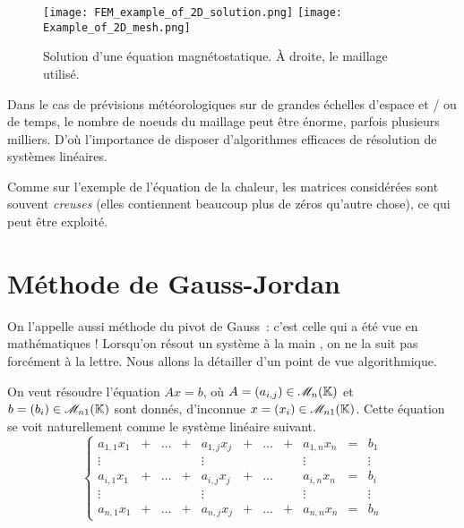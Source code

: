 \begin{figure}
\begin{center}
  \texttt{[image: FEM\_example\_of\_2D\_solution.png]}
  \texttt{[image: Example\_of\_2D\_mesh.png]}
  \caption{Solution d'une équation magnétostatique. À droite, le maillage utilisé.}
  \label{fig:eqelectromag}
\end{center}
\end{figure}



Dans le cas de prévisions météorologiques sur de grandes échelles d'espace et / ou de temps, le nombre de noeuds du 
maillage peut être énorme, parfois plusieurs milliers. D'où l'importance de disposer d'algorithmes efficaces de 
résolution de systèmes linéaires.

Comme sur l'exemple de l'équation de la chaleur, les matrices considérées sont souvent \emph{creuses} (elles 
contiennent beaucoup plus de zéros qu'autre chose), ce qui peut être exploité.


\section{Méthode de Gauss-Jordan}

On l'appelle aussi \og méthode du pivot de Gauss\fg\ : c'est celle qui a été vue en mathématiques ! 
Lorsqu'on résout un système \og à la main \fg, on ne la suit pas forcément à la lettre.
Nous allons la détailler d'un point de vue algorithmique. 

On veut résoudre l'équation $Ax = b$, où $A = (a_{i,j}) \in\mathscr{M}_{n}(\mathbb{K})$ et $b = (b_i) \in \mathscr{M}_{n1}(\mathbb{K})$ sont donnés,
d'inconnue $x = (x_i) \in \mathscr{M}_{n1}(\mathbb{K})$. Cette équation se voit naturellement comme le système linéaire suivant.
\begin{equation}\label{eq:systeme}\tag{$\cS$}
  \left\{\begin{array}{cccccccccccc} 
a_{1,1} x_1 & + & \dots & + & a_{1,j}x_j & + & \dots & + & a_{1,n} x_n & = & b_1 \\ 
     \vdots &   &       &   & \vdots     &   &       &   & \vdots      &   &\vdots \\ 
a_{i,1} x_1 & + & \dots & + & a_{i,j}x_j & + & \dots &   & a_{i,n} x_n & = & b_i \\ 
     \vdots &   &       &   & \vdots     &   &       &   & \vdots      &   &\vdots \\ 
a_{n,1} x_1 & + & \dots & + & a_{n,j}x_j & + & \dots & + & a_{n,n} x_n & = & b_n  
\end{array}\right.
\end{equation}


